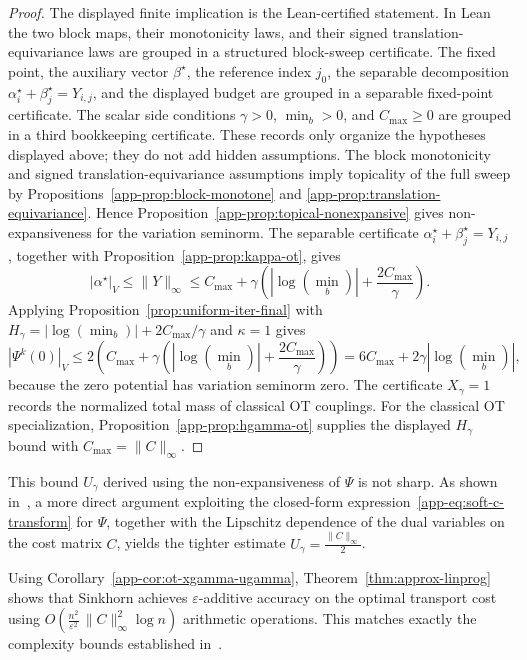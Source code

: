\documentclass{article}
\theoremstyle{plain}
\newcommand{\Umax}{U_\gamma}
\newcommand{\Xmax}{X_\gamma}
\begin{document}
\begin{proof}
The displayed finite implication is the Lean-certified statement.  In Lean the
two block maps, their monotonicity laws, and their signed
translation-equivariance laws are grouped in a structured block-sweep
certificate.  The fixed point, the auxiliary vector \(\beta^\star\), the
reference index \(j_0\), the separable decomposition
\(\alpha^\star_i+\beta^\star_j=Y_{i,j}\), and the displayed budget are grouped
in a separable fixed-point certificate.  The scalar side conditions
\(\gamma>0\), \(\min_b>0\), and \(C_{\max}\ge0\) are grouped in a third
bookkeeping certificate.  These records only organize the hypotheses displayed
above; they do not add hidden assumptions.  The block
monotonicity and signed translation-equivariance assumptions imply topicality
of the full sweep by Propositions~\ref{app-prop:block-monotone} and
\ref{app-prop:translation-equivariance}.  Hence
Proposition~\ref{app-prop:topical-nonexpansive} gives non-expansiveness for the
variation seminorm.  The separable certificate
\(\alpha^\star_i+\beta^\star_j=Y_{i,j}\), together with
Proposition~\ref{app-prop:kappa-ot}, gives
\[
  |\alpha^\star|_V\le \|Y\|_\infty
  \le C_{\max}+\gamma\left(|\log(\min_b)|+\frac{2C_{\max}}{\gamma}\right).
\]
Applying Proposition~\ref{prop:uniform-iter-final} with
\(H_\gamma=|\log(\min_b)|+2C_{\max}/\gamma\) and \(\kappa=1\) gives
\[
|\Psi^k(0)|_V
\le
2\left(C_{\max}
  +\gamma\left(|\log(\min_b)|+\frac{2C_{\max}}{\gamma}\right)\right)
=6C_{\max}+2\gamma|\log(\min_b)|,
\]
because the zero potential has variation seminorm zero.  The certificate
\(\Xmax=1\) records the normalized total mass of classical OT couplings.  For
the classical OT specialization, Proposition~\ref{app-prop:hgamma-ot} supplies
the displayed \(H_\gamma\) bound with \(C_{\max}=\|C\|_\infty\).
\end{proof}

This bound $\Umax$ derived using the non-expansiveness of $\Psi$ is not sharp. As shown in~\cite{chizat2020faster}, a more direct argument exploiting the closed-form expression~\eqref{app-eq:soft-c-transform} for $\Psi$, together with the Lipschitz dependence of the dual variables on the
cost matrix $C$, yields the tighter estimate $\Umax = \frac{\|C\|_\infty}{2}$.

Using Corollary~\ref{app-cor:ot-xgamma-ugamma}, Theorem~\ref{thm:approx-linprog} shows that Sinkhorn achieves
$\varepsilon$-additive accuracy on the optimal transport cost using
$	
	O( \frac{n^2}{\varepsilon^2}\,\|C\|_\infty^2 \log n )
$
arithmetic operations. This matches exactly the complexity bounds established
in~\cite{altschuler2017near,chakrabarty2021sinkhornsublinearrate,
dvurechensky2018computational,chizat2020faster}.
\end{document}
